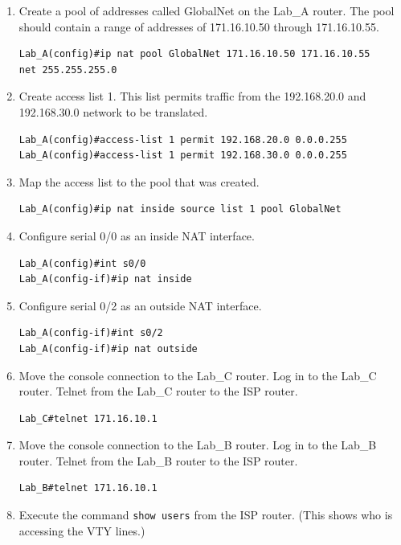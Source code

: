 \documentclass[b5paper,11pt]{memoir}
\begin{document}
\begin{enumerate}
\item
  Create a pool of addresses called GlobalNet on the Lab\_A router. The
  pool should contain a range of addresses of 171.16.10.50 through
  171.16.10.55.

\begin{verbatim}
Lab_A(config)#ip nat pool GlobalNet 171.16.10.50 171.16.10.55
net 255.255.255.0
\end{verbatim}
\item
  Create access list
  1. This list permits traffic from the 192.168.20.0 and 192.168.30.0
  network to be translated.

\begin{verbatim}
Lab_A(config)#access-list 1 permit 192.168.20.0 0.0.0.255
Lab_A(config)#access-list 1 permit 192.168.30.0 0.0.0.255
\end{verbatim}
\item
  Map the access list to the pool that was created.

\begin{verbatim}
Lab_A(config)#ip nat inside source list 1 pool GlobalNet
\end{verbatim}
\item
  Configure serial 0/0 as an inside NAT interface.

\begin{verbatim}
Lab_A(config)#int s0/0
Lab_A(config-if)#ip nat inside
\end{verbatim}
\item
  Configure serial 0/2 as an outside NAT interface.

\begin{verbatim}
Lab_A(config-if)#int s0/2
Lab_A(config-if)#ip nat outside
\end{verbatim}
\item
  Move the console connection to the Lab\_C router. Log in to the Lab\_C
  router. Telnet from the Lab\_C router to the ISP router.

\begin{verbatim}
Lab_C#telnet 171.16.10.1
\end{verbatim}
\item
  Move the console connection to the Lab\_B router. Log in to the Lab\_B
  router. Telnet from the Lab\_B router to the ISP router.

\begin{verbatim}
Lab_B#telnet 171.16.10.1
\end{verbatim}
\item
  Execute the command \texttt{show\ users} from the ISP router. (This
  shows who is accessing the VTY lines.)


\end{enumerate}
\end{document}
